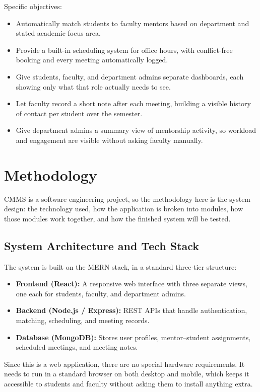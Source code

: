 \documentclass[11pt]{article}
\begin{document}
Specific objectives:
\begin{itemize}[leftmargin=1.4em, itemsep=0.2em]
  \item Automatically match students to faculty mentors based on department and stated academic focus area.
  \item Provide a built-in scheduling system for office hours, with conflict-free booking and every meeting automatically logged.
  \item Give students, faculty, and department admins separate dashboards, each showing only what that role actually needs to see.
  \item Let faculty record a short note after each meeting, building a visible history of contact per student over the semester.
  \item Give department admins a summary view of mentorship activity, so workload and engagement are visible without asking faculty manually.
\end{itemize}

\section{Methodology}
CMMS is a software engineering project, so the methodology here is the system design: the technology used, how the application is broken into modules, how those modules work together, and how the finished system will be tested.

\subsection{System Architecture and Tech Stack}
The system is built on the MERN stack, in a standard three-tier structure:
\begin{itemize}[leftmargin=1.4em, itemsep=0.2em]
  \item \textbf{Frontend (React):} A responsive web interface with three separate views, one each for students, faculty, and department admins.
  \item \textbf{Backend (Node.js / Express):} REST APIs that handle authentication, matching, scheduling, and meeting records.
  \item \textbf{Database (MongoDB):} Stores user profiles, mentor--student assignments, scheduled meetings, and meeting notes.
\end{itemize}
Since this is a web application, there are no special hardware requirements. It needs to run in a standard browser on both desktop and mobile, which keeps it accessible to students and faculty without asking them to install anything extra.
\end{document}
